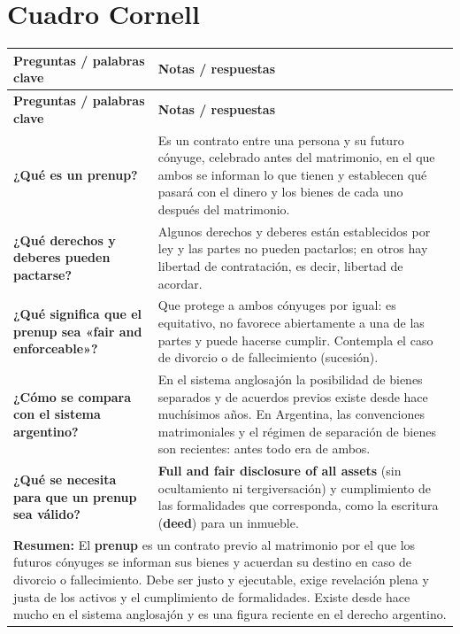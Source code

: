 \documentclass[12pt,oneside]{book}
\newlength{\cornL}
\newlength{\cornR}
\newlength{\cornW}
\begin{document}
\section{Cuadro Cornell}

\begin{longtable}{@{}p{\cornL}|p{\cornR}@{}}
\toprule
\textbf{Preguntas / palabras clave} & \textbf{Notas / respuestas} \\
\midrule
\endfirsthead
\toprule
\textbf{Preguntas / palabras clave} & \textbf{Notas / respuestas} \\
\midrule
\endhead
\bottomrule
\endfoot
\bottomrule
\endlastfoot

\textbf{¿Qué es un prenup?} &
Es un contrato entre una persona y su futuro cónyuge, celebrado antes del matrimonio, en el que ambos se informan lo que tienen y establecen qué pasará con el dinero y los bienes de cada uno después del matrimonio. \\[0.6em]

\textbf{¿Qué derechos y deberes pueden pactarse?} &
Algunos derechos y deberes están establecidos por ley y las partes no pueden pactarlos; en otros hay libertad de contratación, es decir, libertad de acordar. \\[0.6em]

\textbf{¿Qué significa que el prenup sea «fair and enforceable»?} &
Que protege a ambos cónyuges por igual: es equitativo, no favorece abiertamente a una de las partes y puede hacerse cumplir. Contempla el caso de divorcio o de fallecimiento (sucesión). \\[0.6em]

\textbf{¿Cómo se compara con el sistema argentino?} &
En el sistema anglosajón la posibilidad de bienes separados y de acuerdos previos existe desde hace muchísimos años. En Argentina, las convenciones matrimoniales y el régimen de separación de bienes son recientes: antes todo era de ambos. \\[0.6em]

\textbf{¿Qué se necesita para que un prenup sea válido?} &
\textbf{Full and fair disclosure of all assets} (sin ocultamiento ni tergiversación) y cumplimiento de las formalidades que corresponda, como la escritura (\textbf{deed}) para un inmueble. \\[0.6em]

\midrule
\multicolumn{2}{p{\cornW}}{%
\textbf{Resumen:} El \textbf{prenup} es un contrato previo al matrimonio por el que los futuros cónyuges se informan sus bienes y acuerdan su destino en caso de divorcio o fallecimiento. Debe ser justo y ejecutable, exige revelación plena y justa de los activos y el cumplimiento de formalidades. Existe desde hace mucho en el sistema anglosajón y es una figura reciente en el derecho argentino.
} \\
\end{longtable}
\end{document}
